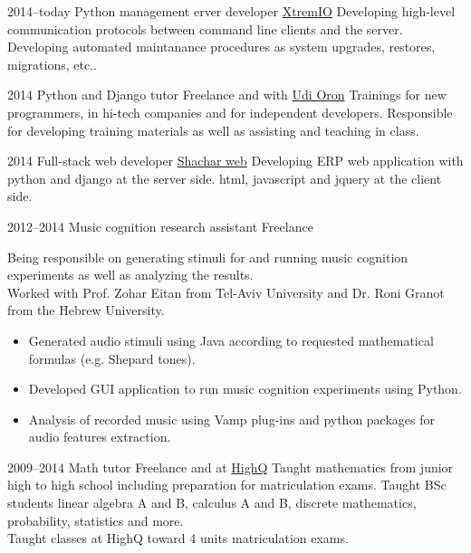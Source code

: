 \documentclass[]{friggeri-cv}  %
\begin{document}
\begin{entrylist}

    \entry
    {2014--today}
    {Python management erver developer}
    {\href{http://xtremio.com/}{XtremIO}}
    {Developing high-level communication protocols between command line clients and the server. Developing automated maintanance procedures as system upgrades, restores, migrations, etc..}

\end{entrylist}
\begin{entrylist}

    \entry
    {2014}
    {Python and Django tutor}
    {Freelance and with \href{http://www.10x.org.il/}{Udi Oron}}
    {Trainings for new programmers, in hi-tech companies and for independent developers. Responsible for developing training materials as well as assisting and teaching in class.}

\end{entrylist}
\begin{entrylist}

    \entry
    {2014}
    {Full-stack web developer}
    {\href{http://www.shachar-web.co.il/}{Shachar web}}
    {Developing ERP web application with python and django at the server side. html, javascript and jquery at the client side.}

\end{entrylist}
\begin{entrylist}

    \entry
    {2012--2014}
    {Music cognition research assistant}
    {Freelance}
    {Being responsible on generating stimuli for and running music cognition experiments as well as analyzing the results.\\
    Worked with Prof. Zohar Eitan from Tel-Aviv University and Dr. Roni Granot from the Hebrew University.
    \begin{itemize}
    \item Generated audio stimuli using Java according to requested mathematical formulas (e.g. Shepard tones).
    \item Developed GUI application to run music cognition experiments using Python.
    \item Analysis of recorded music using Vamp plug-ins and python packages for audio features extraction.
    \end{itemize}}

\end{entrylist}
\begin{entrylist}

    \entry
    {2009--2014}
    {Math tutor}
    {Freelance and at \href{http://high-q.co.il/}{HighQ}}
    {Taught mathematics from junior high to high school including preparation for matriculation exams. Taught BSc students linear algebra A and B, calculus A and B, discrete mathematics, probability, statistics and more.\\
    Taught classes at HighQ toward 4 units matriculation exams.}

\end{entrylist}
\end{document}

